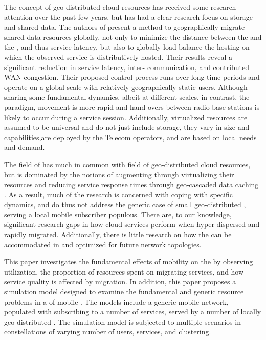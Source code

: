 The concept of geo-distributed cloud resources has received some research attention over the past few years, but has had a clear research focus on storage and shared data. The authors of \cite{agarwal2010volley} present a method to geographically migrate shared data resources globally, not only to minimize the distance between the \ue{} and the \dc{}, and thus service latency, but also to globally load-balance the hosting \dcs{} on which the observed service is distributively hosted. Their results reveal a significant reduction in service latency, inter-\dc{} communication, and contributed WAN congestion. Their proposed control process runs over long time periods and operate on a global scale with relatively geographically static users. Although sharing some fundamental dynamics, albeit at different scales, in contrast, the \xcloud{} paradigm, \ue{} movement is more rapid and hand-overs between radio base stations is likely to occur during a service session. Additionally, \xcloud{} virtualized resources are assumed to be universal and do not just include storage, they vary in size and capabilities,are  deployed by the Telecom operators, and are based on local needs and demand.

The field of \xcloud{} has much in common with field of geo-distributed cloud resources, but is dominated by the notions of augmenting \ues{} through virtualizing their resources \cite{6563280} and reducing service response times through geo-cascaded data caching \cite{1437087,ericsson_akami}. As a result, much of the research is concerned with coping with specific dynamics, and do thus not address the generic case of small geo-distributed \dcs{}, serving a local mobile subscriber populous. There are, to our knowledge, significant research gaps in how cloud services perform when hyper-dispersed and rapidly migrated. Additionally, there is little research on how the \xcloud{} can be accommodated in and optimized for future network topologies.

This paper investigates the fundamental effects of \ue{} mobility on the \xcloud{} by observing \dc{} utilization, the proportion of \dcs{} resources spent on migrating services, and how service quality is affected by migration. In addition, this paper proposes a simulation model designed to examine the fundamental and generic resource problems in a \xcloud{} of mobile \ues{}. The models include a generic mobile network, populated with \ues{} subscribing to a number of services, served by a number of locally geo-distributed \dcs{}. The simulation model is subjected to multiple scenarios in constellations of varying number of users, services, and \dc{} clustering.

